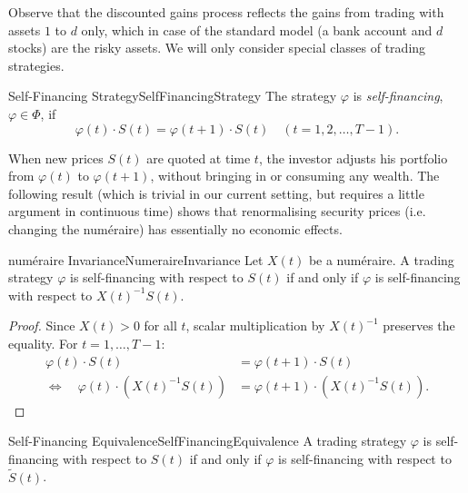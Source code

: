 Observe that the discounted gains process reflects the gains from trading with assets \(1\) to \(d\) only, which in case of the standard model (a bank account and \(d\) stocks) are the risky assets. We will only consider special classes of trading strategies.

\begin{defn}{Self-Financing Strategy}{SelfFinancingStrategy}
	The strategy \(\varphi\) is \emph{self-financing}, \(\varphi \in \Phi\), if
	\begin{equation}
		\varphi(t) \cdot S(t) = \varphi(t+1) \cdot S(t) \quad (t=1, 2, \dots, T-1).
		\label{eq:SelfFinancingCondition}
	\end{equation}
\end{defn}

\begin{xtip}
	When new prices \(S(t)\) are quoted at time \(t\), the investor adjusts his portfolio from \(\varphi(t)\) to \(\varphi(t+1)\), without bringing in or consuming any wealth. The following result (which is trivial in our current setting, but requires a little argument in continuous time) shows that renormalising security prices (i.e. changing the num\'{e}raire) has essentially no economic effects.
\end{xtip}

\begin{prop}{num\'{e}raire Invariance}{NumeraireInvariance}
	Let \(X(t)\) be a num\'{e}raire. A trading strategy \(\varphi\) is self-financing with respect to \(S(t)\) if and only if \(\varphi\) is self-financing with respect to \(X(t)^{-1}S(t)\).
\end{prop}

\begin{proof}
	Since \(X(t) > 0\) for all \(t\), scalar multiplication by \(X(t)^{-1}\) preserves the equality. For \(t=1, \dots, T-1\):
	\begin{align*}
		\varphi(t) \cdot S(t)                       & = \varphi(t+1) \cdot S(t)             \\
		\iff \quad \varphi(t) \cdot (X(t)^{-1}S(t)) & = \varphi(t+1) \cdot (X(t)^{-1}S(t)).
	\end{align*}
\end{proof}

\begin{cor}{Self-Financing Equivalence}{SelfFinancingEquivalence}
	A trading strategy \(\varphi\) is self-financing with respect to \(S(t)\) if and only if \(\varphi\) is self-financing with respect to \(\tilde{S}(t)\).
\end{cor}

